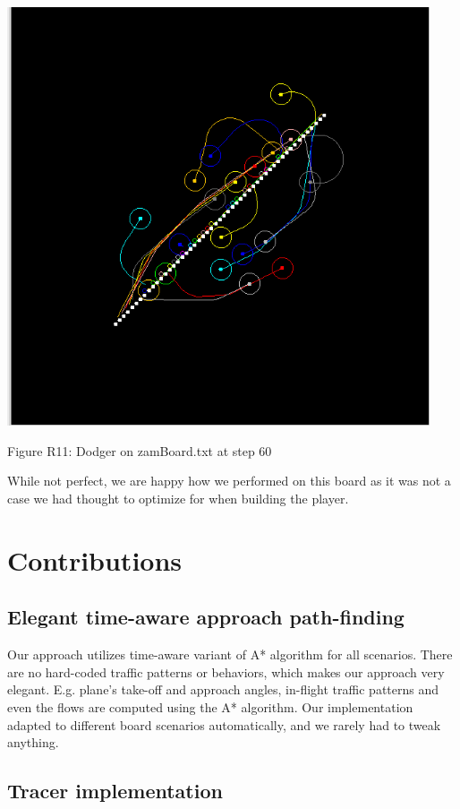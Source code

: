 \documentclass[10pt]{article}
\begin{document}
\includegraphics[width=125mm]{pics/R11.png}
\caption{Figure R11: Dodger on zamBoard.txt at step 60}

While not perfect, we are happy how we performed on this board as it was not a case we had thought to optimize for when building the player.

\newpage
\section{Contributions}

\subsection{Elegant time-aware approach path-finding}

Our approach utilizes time-aware variant of A* algorithm for all scenarios.
There are no hard-coded traffic patterns or behaviors, which makes our approach
very elegant. E.g. plane's take-off and approach angles, in-flight traffic
patterns and even the flows are computed using the A* algorithm. Our
implementation adapted to different board scenarios automatically, and we rarely
had to tweak anything.

\subsection{Tracer implementation}
\end{document}
